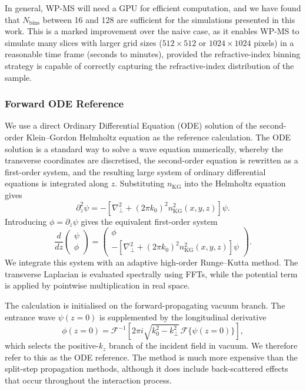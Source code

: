 \documentclass[preprint,12pt,number]{elsarticle}
\begin{document}
In general, WP-MS will need a GPU for efficient computation, and we have found
that $N_{\mathrm{bins}}$ between 16 and 128 are sufficient for the simulations
presented in this work. This is a marked improvement over the naive case, as it
enables WP-MS to simulate many slices with larger grid sizes
($512 \times 512$ or $1024 \times 1024$ pixels) in a reasonable time frame
(seconds to minutes), provided the refractive-index binning strategy is capable
of correctly capturing the refractive-index distribution of the sample.

\subsubsection{Forward ODE Reference}
\label{sec:forward_ode_reference}

We use a direct Ordinary Differential Equation (ODE) solution of the second-order Klein--Gordon Helmholtz
equation as the reference calculation. The ODE solution is a standard way to solve a wave
equation numerically, whereby the transverse coordinates are discretised, the
second-order equation is rewritten as a first-order system, and the resulting
large system of ordinary differential equations is integrated along $z$.
Substituting $n_\mathrm{KG}$ into the Helmholtz equation gives
\begin{equation}
\label{eq:kg_second_order}
\partial_z^2\psi
=
-\left[\nabla_\perp^2+(2\pi k_0)^2n_\mathrm{KG}^2(x,y,z)\right]\psi .
\end{equation}
Introducing $\phi=\partial_z\psi$ gives the equivalent first-order system
\begin{equation}
\label{eq:kg_state}
\frac{d}{dz}
\begin{pmatrix}
\psi\\
\phi
\end{pmatrix}
=
\begin{pmatrix}
\phi\\
-\left[\nabla_\perp^2+(2\pi k_0)^2n_\mathrm{KG}^2(x,y,z)\right]\psi
\end{pmatrix}.
\end{equation}
We integrate this system with an adaptive high-order Runge--Kutta method. The
transverse Laplacian is evaluated spectrally using FFTs, while the potential
term is applied by pointwise multiplication in real space.

The calculation is initialised on the forward-propagating vacuum branch. The
entrance wave $\psi(z=0)$ is supplemented by the longitudinal derivative
\begin{equation}
\label{eq:kg_phi0}
\phi(z=0)
=
\mathcal F^{-1}
\left[
2\pi i\sqrt{k_0^2-k_\perp^2}\,
\mathcal F\{\psi(z=0)\}
\right],
\end{equation}
which selects the positive-$k_z$ branch of the incident field in vacuum. We
therefore refer to this as the ODE reference. The method is much more
expensive than the split-step propagation methods, although it does include back-scattered effects
that occur throughout the interaction process. 
\end{document}
